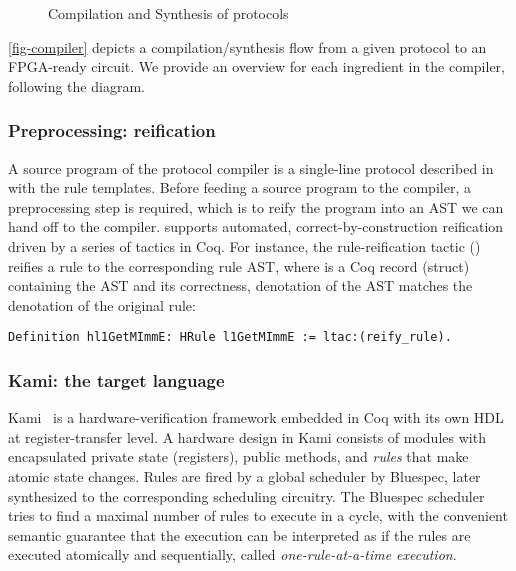 \begin{figure}[t]
  \caption{Compilation and Synthesis of \hemiola{} protocols}
  \label{fig-compiler}
\end{figure}

\autoref{fig-compiler} depicts a compilation/synthesis flow from a given \hemiola{} protocol to an FPGA-ready circuit.
We provide an overview for each ingredient in the compiler, following the diagram.

\subsubsection{Preprocessing: reification}

A source program of the protocol compiler is a single-line protocol described in \hemiola{} with the rule templates.
Before feeding a \hemiola{} source program to the compiler, a preprocessing step is required, which is to reify the program into an AST we can hand off to the compiler.
\hemiola{} supports automated, correct-by-construction reification driven by a series of tactics in Coq.
For instance, the rule-reification tactic () reifies a \hemiola{} rule to the corresponding rule AST, where  is a Coq record (struct) containing the AST and its correctness, \ie{} denotation of the AST matches the denotation of the original rule:
\begin{lstlisting}[numbers=none, frame=none]
    Definition hl1GetMImmE: HRule l1GetMImmE := ltac:(reify_rule).
\end{lstlisting}

\subsubsection{Kami: the target language}

Kami~\cite{kami} is a hardware-verification framework embedded in Coq with its own HDL at register-transfer level.
A hardware design in Kami consists of modules with encapsulated private state (registers), public methods, and \emph{rules} that make atomic state changes.
Rules are fired by a global scheduler by Bluespec, later synthesized to the corresponding scheduling circuitry.
The Bluespec scheduler tries to find a maximal number of rules to execute in a cycle, with the convenient semantic guarantee that the execution can be interpreted as if the rules are executed atomically and sequentially, called \emph{one-rule-at-a-time execution}.

